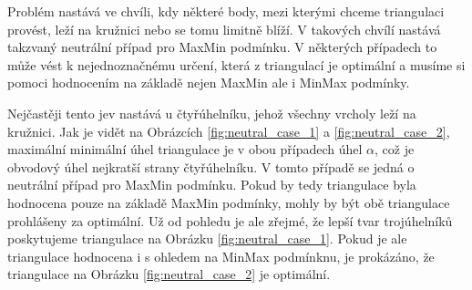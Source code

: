 \documentclass[12pt,a4paper]{article}
\begin{document}
Problém nastává ve chvíli, kdy některé body, mezi kterými chceme triangulaci provést, leží na kružnici nebo se tomu limitně blíží. V takových chvílí nastává takzvaný neutrální případ pro MaxMin podmínku. V některých případech to může vést k nejednoznačnému určení, která z triangulací je optimální a musíme si pomoci hodnocením na základě nejen MaxMin ale i MinMax podmínky.

\begin{figure}[h!]
\centering
\begin{floatrow}
\end{floatrow}
\end{figure}


Nejčastěji tento jev nastává u čtyřúhelníku, jehož všechny vrcholy leží na kružnici. Jak je vidět na Obrázcích \ref{fig:neutral_case_1} a \ref{fig:neutral_case_2}, maximální minimální úhel triangulace je v obou případech úhel $\alpha$, což je obvodový úhel nejkratší strany čtyřúhelníku. V tomto případě se jedná o neutrální případ pro MaxMin podmínku. Pokud by tedy triangulace byla hodnocena pouze na základě MaxMin podmínky, mohly by být obě triangulace prohlášeny za optimální. Už od pohledu je ale zřejmé, že lepší tvar trojúhelníků poskytujeme triangulace na Obrázku \ref{fig:neutral_case_1}. Pokud je ale triangulace hodnocena i s ohledem na MinMax podmínknu, je prokázáno, že triangulace na Obrázku \ref{fig:neutral_case_2} je optimální.
\end{document}
